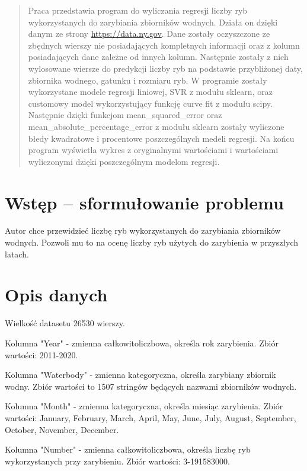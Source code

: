\documentclass[10pt]{article}
\begin{document}


\begin{abstract}

Praca przedstawia program do wyliczania regresji liczby ryb wykorzystanych do zarybiania zbiorników wodnych. Działa on dzięki danym ze strony \url{https://data.ny.gov}. Dane zostały oczyszczone ze zbędnych wierszy nie posiadających kompletnych informacji oraz z kolumn posiadających dane zależne od innych kolumn. Następnie zostały z nich wylosowane wiersze do predykcji liczby ryb na podstawie przybliżonej daty, zbiornika wodnego, gatunku i rozmiaru ryb. W programie zostały wykorzystane modele regresji liniowej, SVR z modułu sklearn, oraz customowy model wykorzystujący funkcję curve fit z modułu scipy. Następnie dzięki funkcjom mean\_squared\_error oraz mean\_absolute\_percentage\_error z modułu sklearn zostały wyliczone błedy kwadratowe i procentowe poszczególnych medeli regresji. Na końcu program wyświetla wykres z oryginalnymi wartościami i wartościami wyliczonymi dzięki poszczególnym modelom regresji.

\end{abstract}

\section{Wstęp -- sformułowanie problemu}
\label{sec:wstep}
Autor chce przewidzieć liczbę ryb wykorzystanych do zarybiania zbiorników wodnych. Pozwoli mu to na ocenę liczby ryb użytych do zarybienia w przyszłych latach.

\section{Opis danych}
Wielkość datasetu 26530 wierszy.

Kolumna "Year" - zmienna całkowitoliczbowa, określa rok zarybienia. Zbiór wartości: 2011-2020.

Kolumna "Waterbody" - zmienna kategoryczna, określa zarybiany zbiornik wodny. Zbiór wartości to 1507 stringów będących nazwami zbiorników wodnych.

Kolumna "Month" - zmienna kategoryczna, określa miesiąc zarybienia. Zbiór wartości: January, February, March, April, May, June, July, August, September, October, November, December.

Kolumna "Number" - zmienna całkowitoliczbowa, określa liczbę ryb wykorzystanych przy zarybieniu.
Zbiór wartości: 3-191583000.
\end{document}
